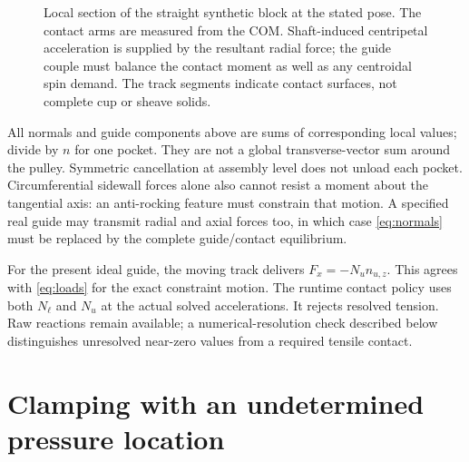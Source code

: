 \documentclass[11pt,letterpaper]{article}
\numberwithin{equation}{section}
\newcommand{\er}{\bm e_r}\newcommand{\et}{\bm e_t}\newcommand{\ez}{\bm e_z}
\begin{document}
\begin{figure}[htbp]\centering
{}
\caption{Local section of the straight synthetic block at the stated pose.
The contact arms are measured from the COM. Shaft-induced centripetal
acceleration is supplied by the resultant radial force; the guide couple must
balance the contact moment as well as any centroidal spin demand. The track
segments indicate contact surfaces, not complete cup or sheave solids.}
\label{fig:fbd}
\end{figure}

All normals and guide components above are sums of corresponding local values;
divide by $n$ for one pocket. They are not a global transverse-vector sum around
the pulley. Symmetric cancellation at assembly level does not unload each
pocket. Circumferential sidewall forces alone also cannot resist a moment
about the tangential axis: an anti-rocking feature must constrain that motion.
A specified real guide may transmit radial and axial forces too, in which case
\cref{eq:normals} must be replaced by the complete guide/contact equilibrium.

For the present ideal guide, the moving track delivers
$F_x=-N_u n_{u,z}$. This agrees with \cref{eq:loads} for the exact constraint
motion. The runtime contact policy uses both $N_\ell$ and $N_u$ at the actual
solved accelerations. It rejects resolved tension. Raw reactions remain
available; a numerical-resolution check described below distinguishes
unresolved near-zero values from a required tensile contact.

\section{Clamping with an undetermined pressure location}
\label{sec:distributed}
\end{document}
